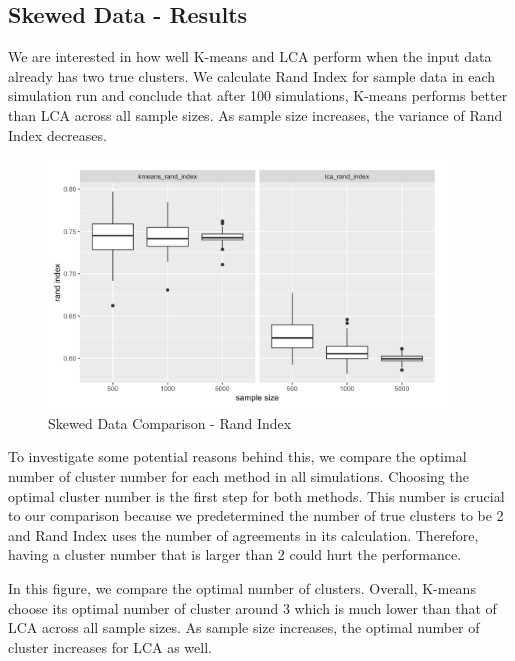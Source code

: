 \documentclass[
]{article}
\begin{document}
\hypertarget{skewed-data---results}{%
\subsection{Skewed Data - Results}\label{skewed-data---results}}

We are interested in how well K-means and LCA perform when the input
data already has two true clusters. We calculate Rand Index for sample
data in each simulation run and conclude that after 100 simulations,
K-means performs better than LCA across all sample sizes. As sample size
increases, the variance of Rand Index decreases.

\begin{figure}
\centering
\includegraphics[width=4.16667in,height=\textheight]{report_image/skewed_data_rand_index_results.png}
\caption{Skewed Data Comparison - Rand Index}
\end{figure}

To investigate some potential reasons behind this, we compare the
optimal number of cluster number for each method in all simulations.
Choosing the optimal cluster number is the first step for both methods.
This number is crucial to our comparison because we predetermined the
number of true clusters to be 2 and Rand Index uses the number of
agreements in its calculation. Therefore, having a cluster number that
is larger than 2 could hurt the performance.

In this figure, we compare the optimal number of clusters. Overall,
K-means choose its optimal number of cluster around 3 which is much
lower than that of LCA across all sample sizes. As sample size
increases, the optimal number of cluster increases for LCA as well.
\end{document}
